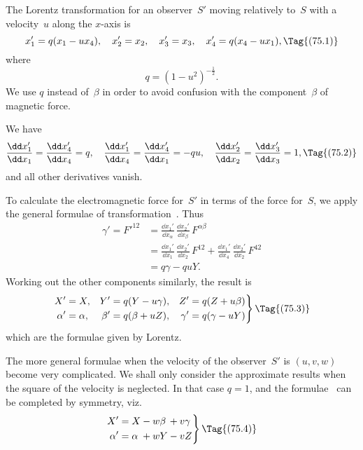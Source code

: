 \documentclass[12pt]{book}
\begin{document}
%
%

The Lorentz transformation for an observer~$S'$ moving relatively to~$S$ with
a velocity~$u$ along the $x$-axis is
\[
x_{1}' = q(x_{1} - u x_{4}),\quad
x_{2}' = x_{2},\quad
x_{3}' = x_{3},\quad
x_{4}' = q(x_{4} - u x_{1}),
\Tag{(75.1)}
\]
where
\[
q = (1 - u^{2})^{-\frac{1}{2}}.
\]
We use $q$ instead of~$\beta$ in order to avoid confusion with the component~$\beta$ of
magnetic force.
%
%

We have
\[
\frac{\dd x_{1}'}{\dd x_{1}} = \frac{\dd x_{4}'}{\dd x_{4}} = q,\quad
\frac{\dd x_{1}'}{\dd x_{4}} = \frac{\dd x_{4}'}{\dd x_{1}} = -qu,\quad
\frac{\dd x_{2}'}{\dd x_{2}} = \frac{\dd x_{3}'}{\dd x_{3}} = 1,
\Tag{(75.2)}
\]
and all other derivatives vanish.

To calculate the electromagnetic force for~$S'$ in terms of the force for~$S$,
we apply the general formulae of transformation~. Thus
\begin{align*}
  \gamma' = F'^{12}
  &= \frac{\dd x_{1}'}{\dd x_{\alpha}}\, \frac{\dd x_{2}'}{\dd x_{\beta}}\, F^{\alpha\beta} \\
  &= \frac{\dd x_{1}'}{\dd x_{1}}\, \frac{\dd x_{2}'}{\dd x_{2}}\, F^{12}
   + \frac{\dd x_{1}'}{\dd x_{4}}\, \frac{\dd x_{2}'}{\dd x_{2}}\, F^{42} \\
  &= q\gamma - quY.
\end{align*}
Working out the other components similarly, the result is
\[
\left.
\begin{aligned}
  X' &= X, & Y' &= q(Y - u\gamma), & Z' &= q(Z + u\beta)\\
  \alpha' &= \alpha, & \beta' &= q(\beta + uZ), & \gamma' &= q(\gamma - uY)
\end{aligned}
\right\}
\Tag{(75.3)}
\]
which are the formulae given by Lorentz.

The more general formulae when the velocity of the observer~$S'$ is $(u, v, w)$
become very complicated. We shall only consider the approximate results
when the square of the velocity is neglected. In that case $q = 1$, and the
formulae~ can be completed by symmetry, viz.\
\[
\left.
\begin{alignedat}{3}
  X' &= X &&- w\beta &&+ v\gamma\\
  \alpha' &= \alpha &&+ wY &&- vZ
\end{alignedat}
\right\}
\Tag{(75.4)}
\]
\end{document}
